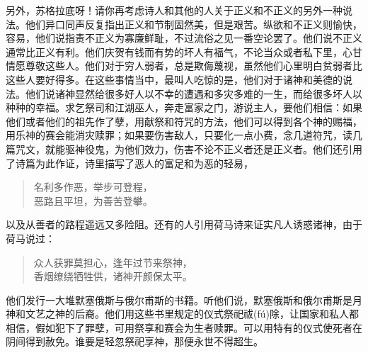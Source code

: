 \documentclass[11pt,oneside]{book}
\begin{document}
\begin{common-format}
另外，苏格拉底呀！请你再考虑诗人和其他的人关于正义和不正义的另外一种说法。他们异口同声反复指出正义和节制固然美，但是艰苦。纵欲和不正义则愉快，容易，他们说指责不正义为寡廉鲜耻，不过流俗之见一番空论罢了。他们说不正义通常比正义有利。他们庆贺有钱而有势的坏人有福气，不论当众或者私下里，心甘情愿尊敬这些人。他们对于穷人弱者，总是欺侮蔑视，虽然他们心里明白贫弱者比这些人要好得多。在这些事情当中，最叫人吃惊的是，他们对于诸神和美德的说法。他们说诸神显然给很多好人以不幸的遭遇和多灾多难的一生，而给很多坏人以种种的幸福。求乞祭司和江湖巫人，奔走富家之门，游说主人，要他们相信：如果他们或者他们的祖先作了孽，用献祭和符咒的方法，他们可以得到各个神的赐福，用乐神的赛会能消灾赎罪；如果要伤害敌人，只要化一点小费，念几道符咒，读几篇咒文，就能驱神役鬼，为他们效力，伤害不论不正义者还是正义者。他们还引用了诗篇为此作证，诗里描写了恶人的富足和为恶的轻易，
\begin{verse}
名利多作恶，举步可登程，\\
恶路且平坦，为善苦登攀。
\end{verse}
以及从善者的路程遥远又多险阻。还有的人引用荷马诗来证实凡人诱惑诸神，由于荷马说过：
\begin{verse}
众人获罪莫担心，逢年过节来祭神，\\
香烟缭绕牺牲供，诸神开颜保太平。
\end{verse}
他们发行一大堆默塞俄斯与俄尔甫斯的书籍。听他们说，默塞俄斯和俄尔甫斯是月神和文艺之神的后裔。他们用这些书里规定的仪式祭祀祓(fú)除，让国家和私人都相信，假如犯下了罪孽，可用祭享和赛会为生者赎罪。可以用特有的仪式使死者在阴间得到赦免。谁要是轻忽祭祀享神，那便永世不得超生。


\end{common-format}
\end{document}
